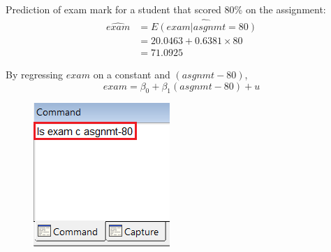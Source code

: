 \documentclass[12pt]{report}
\begin{document}
\noindent Prediction of exam mark for a student that scored 80\% on the assignment:
\begin{align*}
\widehat{exam} &= \widehat{E(exam|asgnmt = 80)} \\
&= 20.0463 + 0.6381{\times}80 \\
&= 71.0925
\end{align*}

\noindent By regressing $exam$ on a constant and $(asgnmt-80)$,
$$exam = \beta_0 + \beta_1(asgnmt-80) + u$$
\begin{figure}[H]
	\centering
	\includegraphics{q1_22}
\end{figure}
\vspace{-\baselineskip}
\end{document}
